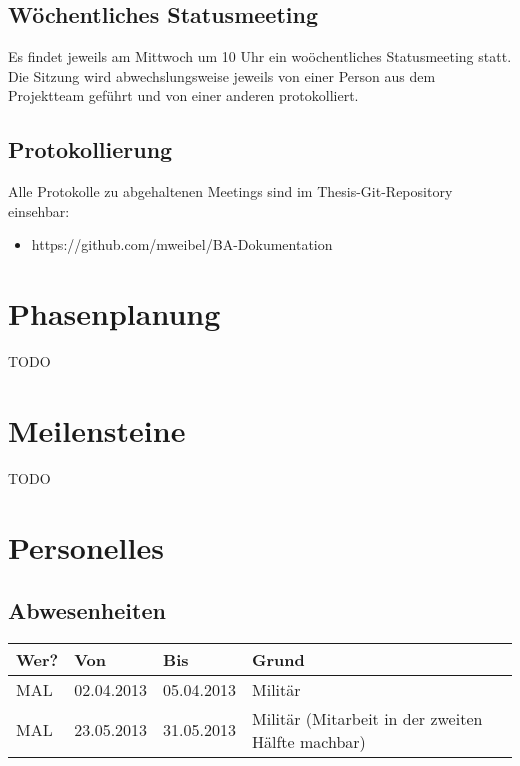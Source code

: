 \subsection{Wöchentliches Statusmeeting}
Es findet jeweils am Mittwoch um 10 Uhr ein woöchentliches Statusmeeting statt. Die Sitzung wird abwechslungsweise jeweils von einer Person aus dem Projektteam geführt und von einer anderen protokolliert.

\subsection{Protokollierung}
Alle Protokolle zu abgehaltenen Meetings sind im Thesis-Git-Repository einsehbar:

\begin{itemize}
	\item https://github.com/mweibel/BA-Dokumentation
\end{itemize}

\section{Phasenplanung}
TODO

\section{Meilensteine}
TODO


\section{Personelles}
\subsection{Abwesenheiten}
\begin{tabular}{l l l l}
Wer? & Von & Bis & Grund \\
\hline
MAL & 02.04.2013 & 05.04.2013 & Militär \\
MAL & 23.05.2013 & 31.05.2013 & Militär (Mitarbeit in der zweiten Hälfte machbar) \\
\end{tabular}